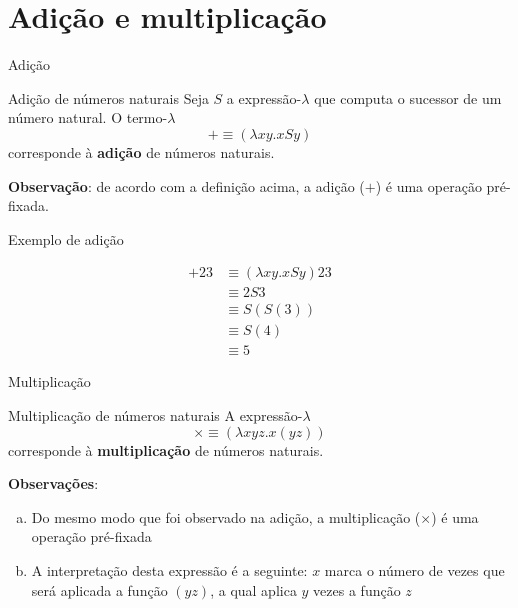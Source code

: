 \section{Adição e multiplicação}

\begin{frame}[fragile]{Adição}

    \begin{block}{Adição de números naturais}
        Seja $S$ a expressão-$\lambda$ que computa o sucessor de um número natural. O 
        termo-$\lambda$
        \[
            + \equiv (\lambda xy.xSy)
        \]
        corresponde à \textbf{adição} de números naturais.
    \end{block}

    \vspace{0.1in}

    \textbf{Observação}: de acordo com a definição acima, a adição ($+$) é uma operação
    pré-fixada.
\end{frame}

\begin{frame}[fragile]{Exemplo de adição}

    \begin{align*}
        +23 &\equiv (\lambda xy.xSy)23 \\
        &\equiv 2S3 \\
        &\equiv S(S(3)) \\
        &\equiv S(4) \\
        &\equiv 5
    \end{align*}

\end{frame}

\begin{frame}[fragile]{Multiplicação}

    \begin{block}{Multiplicação de números naturais}
        A expressão-$\lambda$
        \[
            \times \equiv (\lambda xyz.x(yz))
        \]
        corresponde à \textbf{multiplicação} de números naturais.
    \end{block}

    \vspace{0.1in}

    \textbf{Observações}:
    \begin{enumerate}[(a)]
        \item Do mesmo modo que foi observado na adição, a multiplicação ($\times$) é uma operação 
            pré-fixada
        \item A interpretação desta expressão é a seguinte: $x$ marca o número de vezes que
            será aplicada a função $(yz)$, a qual aplica $y$ vezes a função $z$
    \end{enumerate}
\end{frame}

